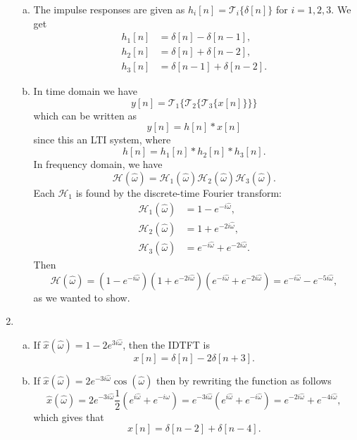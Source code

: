 \begin{enumerate}
\begin{enumerate}[a)]
\item The impulse responses are given as $h_{i}[n]=\mathcal{T}_{i}\{\delta[n]\}$ for $i=1,2,3$. We get
\begin{align*}
    h_{1}[n]&=\delta[n]-\delta[n-1], \\
    h_{2}[n]&=\delta[n]+\delta[n-2], \\
    h_{3}[n]&=\delta[n-1]+\delta[n-2].
\end{align*}

\item In time domain we have 
$$y[n]=\mathcal{T}_{1}\{\mathcal{T}_{2}\{\mathcal{T}_{3}\{x[n]\}\}\}$$
which can be written as
$$y[n]=h[n]*x[n]$$
since this an LTI system, where 
$$h[n]=h_{1}[n]*h_{2}[n]*h_{3}[n].$$
In frequency domain, we have
$$\mathcal{H}(\hat{\omega})=\mathcal{H}_{1}(\hat{\omega})\mathcal{H}_{2}(\hat{\omega})\mathcal{H}_{3}(\hat{\omega}).$$
Each $\mathcal{H}_{1}$ is found by the discrete-time Fourier transform:
\begin{align*}
    \mathcal{H}_{1}(\hat{\omega})&=1-e^{-i\hat{\omega}}, \\
    \mathcal{H}_{2}(\hat{\omega})&=1+e^{-2i\hat{\omega}}, \\
    \mathcal{H}_{3}(\hat{\omega})&=e^{-i\hat{\omega}}+e^{-2i\hat{\omega}}.
\end{align*}
Then
$$\mathcal{H}(\hat{\omega})=(1-e^{-i\hat{\omega}})(1+e^{-2i\hat{\omega}})(e^{-i\hat{\omega}}+e^{-2i\hat{\omega}})=e^{-i\hat{\omega}}-e^{-5i\hat{\omega}},$$
as we wanted to show. 
\end{enumerate}

\item

\begin{enumerate}[a)]
\item If $\hat{x}(\hat{\omega})=1-2e^{3i\hat{\omega}}$, then the IDTFT is
$$x[n]=\delta[n]-2\delta[n+3].$$

\item If $\hat{x}(\hat{\omega})=2e^{-3i\hat{\omega}}\cos(\hat{\omega})$ then by rewriting the function as follows
$$\hat{x}(\hat{\omega})=2e^{-3i\hat{\omega}}\frac{1}{2}(e^{i\hat{\omega}}+e^{-i\hat{\omega}})=e^{-3i\hat{\omega}}(e^{i\hat{\omega}}+e^{-i\hat{\omega}})=e^{-2i\hat{\omega}}+e^{-4i\hat{\omega}},$$
which gives that
$$x[n]=\delta[n-2]+\delta[n-4].$$


\end{enumerate}
\end{enumerate}
